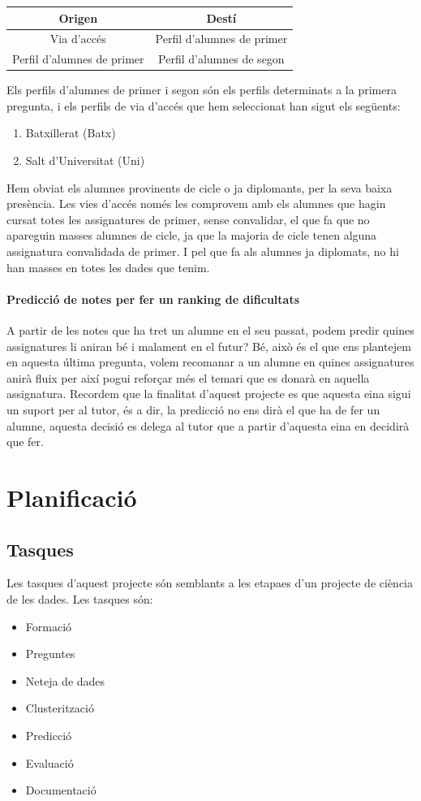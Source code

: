 \documentclass[12pt,a4paper,catalan]{article}
\begin{document}
\begin{table}[h]
\centering
\begin{tabular}{@{}cc@{}}
\toprule
{\bf Origen}               & {\bf Destí}                \\ \midrule
Via d'accés                & Perfil d'alumnes de primer \\
Perfil d'alumnes de primer & Perfil d'alumnes de segon  \\ \bottomrule
\end{tabular}
\end{table}
Els perfils d'alumnes de primer i segon són els perfils determinats a la primera pregunta, i els perfils de via d'accés que hem seleccionat han sigut els següents:
\begin{enumerate}
	\item Batxillerat (Batx)
	\item Salt d'Universitat (Uni)
\end{enumerate}

Hem obviat els alumnes provinents de cicle o ja diplomants, per la seva baixa presència. Les vies d'accés només les comprovem amb els alumnes que hagin cursat totes les assignatures de primer, sense convalidar, el que fa que no apareguin masses alumnes de cicle, ja que la majoria de cicle tenen alguna assignatura convalidada de primer. I pel que fa als alumnes ja diplomats, no hi han masses en totes les dades que tenim.

\paragraph{Predicció de notes per fer un ranking de dificultats}
A partir de les notes que ha tret un alumne en el seu passat, podem predir quines assignatures li aniran bé i malament en el futur? Bé, això és el que ens plantejem en aquesta última pregunta, volem recomanar a un alumne en quines assignatures anirà fluix per així pogui reforçar més el temari que es donarà en aquella assignatura. Recordem que la finalitat d'aquest projecte es que aquesta eina sigui un suport per al tutor, és a dir, la predicció no ens dirà el que ha de fer un alumne, aquesta decisió es delega al tutor que a partir d'aquesta eina en decidirà que fer.
\newpage

\section{Planificació}
\subsection{Tasques}
Les tasques d'aquest projecte són semblants a les etapaes d'un projecte de ciència de les dades. Les tasques són:
\begin{itemize}[leftmargin=.5in]
	\item Formació
	\item Preguntes
	\item Neteja de dades
	\item Clusterització
	\item Predicció
	\item Evaluació
	\item Documentació
\end{itemize}
\end{document}
